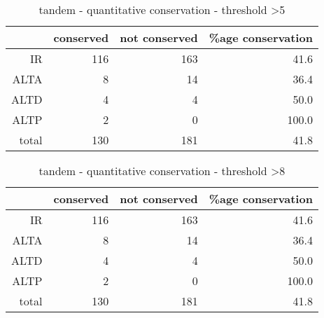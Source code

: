 \documentclass{article}
\begin{document}
\begin{table}[ht]
\centering
\begin{tabular}{rrrr}
  \hline
 & conserved & not conserved & \%age conservation \\ 
  \hline
IR & 116 & 163 & 41.6 \\ 
  ALTA & 8 & 14 & 36.4 \\ 
  ALTD & 4 & 4 & 50.0 \\ 
  ALTP & 2 & 0 & 100.0 \\ 
  total & 130 & 181 & 41.8 \\ 
   \hline
\end{tabular}
\caption{tandem - quantitative conservation - threshold >5} 
\end{table}%
\begin{table}[ht]
\centering
\begin{tabular}{rrrr}
  \hline
 & conserved & not conserved & \%age conservation \\ 
  \hline
IR & 116 & 163 & 41.6 \\ 
  ALTA & 8 & 14 & 36.4 \\ 
  ALTD & 4 & 4 & 50.0 \\ 
  ALTP & 2 & 0 & 100.0 \\ 
  total & 130 & 181 & 41.8 \\ 
   \hline
\end{tabular}
\caption{tandem - quantitative conservation - threshold >8} 
\end{table}
\end{document}
